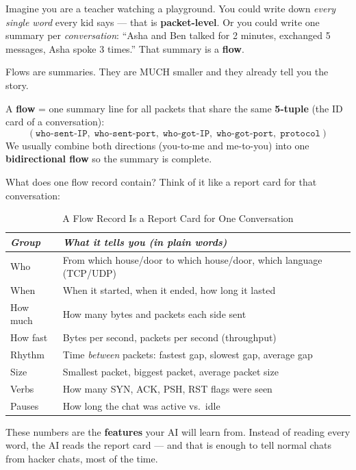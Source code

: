\documentclass[11pt,a4paper]{article}
\begin{document}
\begin{imaginebox}
Imagine you are a teacher watching a playground. You could write down
\emph{every single word} every kid says --- that is \textbf{packet-level}.
Or you could write one summary per \emph{conversation}: ``Asha and Ben talked
for 2 minutes, exchanged 5 messages, Asha spoke 3 times.'' That summary is a
\textbf{flow}.

Flows are summaries. They are MUCH smaller and they already tell you the
story.
\end{imaginebox}

\begin{keybox}
A \textbf{flow} = one summary line for all packets that share the same
\textbf{5-tuple} (the ID card of a conversation):
\[
( \texttt{who-sent-IP},\; \texttt{who-sent-port},\; \texttt{who-got-IP},\; \texttt{who-got-port},\; \texttt{protocol} )
\]
We usually combine both directions (you-to-me and me-to-you) into one
\textbf{bidirectional flow} so the summary is complete.
\end{keybox}

What does one flow record contain? Think of it like a report card for that
conversation:

\begin{table}[H]
\centering
\caption{A Flow Record Is a Report Card for One Conversation}
\small
\begin{tabular}{@{}ll@{}}
\toprule
\emph{Group} & \emph{What it tells you (in plain words)} \\
\midrule
Who & From which house/door to which house/door, which language (TCP/UDP) \\
When & When it started, when it ended, how long it lasted \\
How much & How many bytes and packets each side sent \\
How fast & Bytes per second, packets per second (throughput) \\
Rhythm & Time \emph{between} packets: fastest gap, slowest gap, average gap \\
Size & Smallest packet, biggest packet, average packet size \\
Verbs & How many SYN, ACK, PSH, RST flags were seen \\
Pauses & How long the chat was active vs.\ idle \\
\bottomrule
\end{tabular}
\end{table}

These numbers are the \textbf{features} your AI will learn from. Instead of
reading every word, the AI reads the report card --- and that is enough to
tell normal chats from hacker chats, most of the time.
\end{document}
